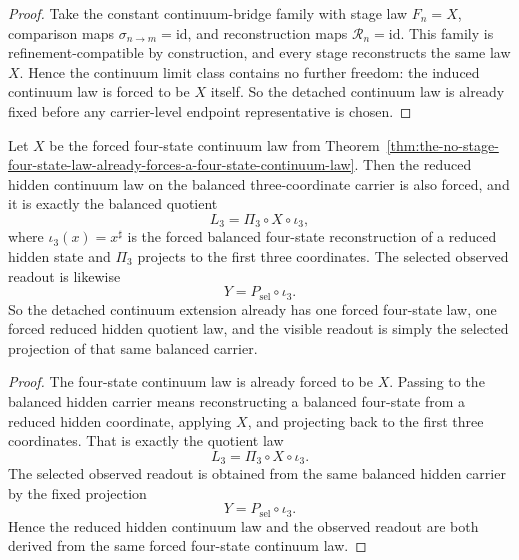 \begin{proof}
Take the constant continuum-bridge family with stage law \(F_n=X\),
comparison maps \(\sigma_{n\to m}=\mathrm{id}\), and reconstruction maps
\(\mathcal R_n=\mathrm{id}\). This family is refinement-compatible by
construction, and every stage reconstructs the same law \(X\). Hence the
continuum limit class contains no further freedom: the induced continuum law is
forced to be \(X\) itself. So the detached continuum law is already fixed
before any carrier-level endpoint representative is chosen.
\end{proof}

\begin{corollary}
\label{cor:the-reduced-hidden-continuum-law-is-the-balanced-quotient-of-the-forced-four-state-continuum-law}
Let \(X\) be the forced four-state continuum law from
Theorem~\ref{thm:the-no-stage-four-state-law-already-forces-a-four-state-continuum-law}.
Then the reduced hidden continuum law on the balanced three-coordinate carrier
is also forced, and it is exactly the balanced quotient
\[
L_3 = \Pi_3 \circ X \circ \iota_3,
\]
where \(\iota_3(x)=x^\sharp\) is the forced balanced four-state reconstruction
of a reduced hidden state and \(\Pi_3\) projects to the first three
coordinates. The selected observed readout is likewise
\[
Y = P_{\mathrm{sel}} \circ \iota_3.
\]
So the detached continuum extension already has one forced four-state law, one
forced reduced hidden quotient law, and the visible readout is simply the
selected projection of that same balanced carrier.
\end{corollary}

\begin{proof}
The four-state continuum law is already forced to be \(X\). Passing to the
balanced hidden carrier means reconstructing a balanced four-state from a
reduced hidden coordinate, applying \(X\), and projecting back to the first
three coordinates. That is exactly the quotient law
\[
L_3=\Pi_3\circ X\circ \iota_3.
\]
The selected observed readout is obtained from the same balanced hidden carrier
by the fixed projection
\[
Y=P_{\mathrm{sel}}\circ \iota_3.
\]
Hence the reduced hidden continuum law and the observed readout are both
derived from the same forced four-state continuum law.
\end{proof}

